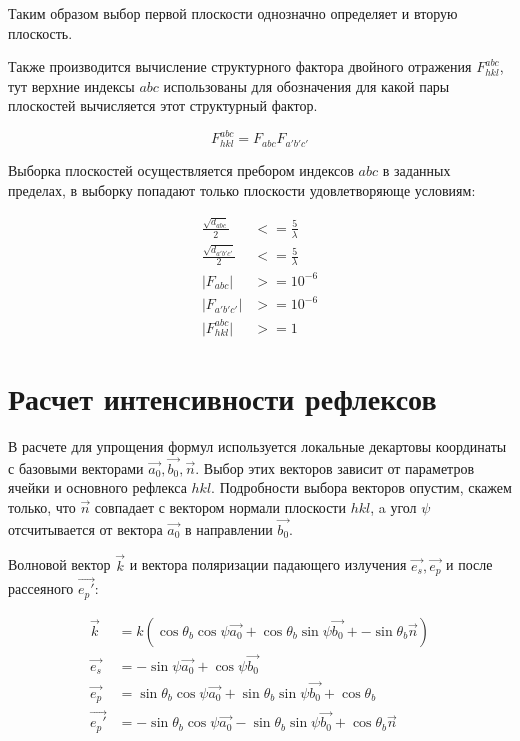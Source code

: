 \documentclass[12pt,a4paper,draft]{article}
\begin{document}
Таким образом выбор первой плоскости однозначно определяет и вторую плоскость.

Также производится вычисление структурного фактора двойного
отражения $ F_{hkl}^{abc} $, тут верхние индексы $abc$ использованы
для обозначения для какой пары плоскостей вычисляется этот структурный фактор.

\begin{equation}
    F_{hkl}^{abc} = F_{abc} F_{a'b'c'}
\end{equation}

Выборка плоскостей осуществляется пребором индексов $abc$ в заданных пределах,
в выборку попадают только плоскости удовлетворяюще условиям:

\begin{align}
    \frac{\sqrt{d_{abc}}}{2} &<= \frac{5}{\lambda} \\
    \frac{\sqrt{d_{a'b'c'}}}{2} &<= \frac{5}{\lambda} \\
    \lvert F_{abc} \rvert &>= 10^{-6} \\
    \lvert F_{a'b'c'} \rvert &>= 10^{-6} \\
    \lvert F_{hkl}^{abc} \rvert &>= 1
\end{align}

\section{Расчет интенсивности рефлексов}

В расчете для упрощения формул используется локальные декартовы координаты
с базовыми векторами $\vec{a_0}, \vec{b_0}, \vec{n}$. Выбор этих векторов зависит
от параметров ячейки и основного рефлекса $hkl$. Подробности выбора векторов опустим,
скажем только, что $\vec{n}$ совпадает с вектором нормали плоскости $hkl$,
a угол $\psi$ отсчитывается от вектора $\vec{a_0}$ в направлении $\vec{b_0}$.

Волновой вектор $\vec{k}$ и вектора поляризации падающего излучения
$\vec{e_s}, \vec{e_p}$ и после рассеяного $\vec{e_p'}$:

\begin{align}
    \vec{k} &= k \left( \cos \theta_b \cos \psi \vec{a_0} + \cos \theta_b \sin \psi \vec{b_0} +- \sin \theta_b \vec{n} \right) \\
    \vec{e_s} &= - \sin \psi \vec{a_0} + \cos \psi \vec{b_0} \\
    \vec{e_p} &= \sin \theta_b \cos \psi \vec{a_0} + \sin \theta_b \sin \psi \vec{b_0} + \cos \theta_b \\
    \vec{e_p'} &= - \sin \theta_b \cos \psi \vec{a_0} - \sin \theta_b \sin \psi \vec{b_0} + \cos \theta_b \vec{n}
\end{align}
\end{document}

